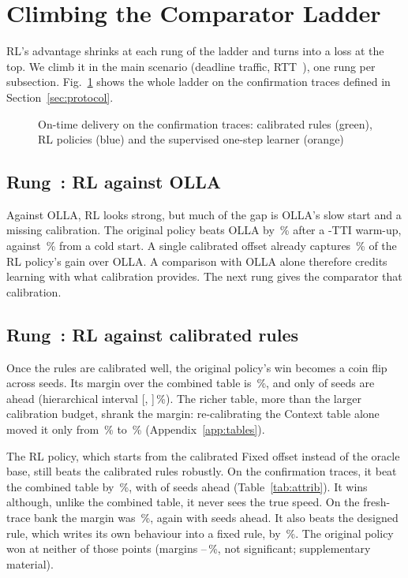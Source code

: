 \section{Climbing the Comparator Ladder}\label{sec:results}
RL's advantage shrinks at each rung of the ladder and turns into a loss at the top. We climb it in the main scenario (deadline traffic, RTT~\NCfgRtt), one rung per subsection. Fig.~\ref{fig:ladder} shows the whole ladder on the confirmation traces defined in Section~\ref{sec:protocol}.

\begin{figure}[t]
\centering

\caption{On-time delivery on the  confirmation traces: calibrated rules (green), RL policies (blue) and the supervised one-step learner (orange)}\label{fig:ladder}
\end{figure}

\subsection{Rung~: RL against OLLA}\label{sec:rung1}
Against OLLA, RL looks strong, but much of the gap is OLLA's slow start and a missing calibration. The original policy beats OLLA by \nosign{\NWoneOLLAWarmMar}\,\% after a \NWoneTTI-TTI warm-up, against \nosign{\NWoneOLLAColdMar}\,\% from a cold start. A single calibrated offset already captures \NMoneCalibShareFixed\,\% of the RL policy's gain over OLLA. A comparison with OLLA alone therefore credits learning with what calibration provides. The next rung gives the comparator that calibration.

\subsection{Rung~: RL against calibrated rules}\label{sec:rung2}
Once the rules are calibrated well, the original policy's win becomes a coin flip across seeds. Its margin over the combined table is \NGsixCtxJMar\,\%, and only \NGsixCtxJAbove{} of \NCfgSeeds{} seeds are ahead (hierarchical interval [\NGsixCtxJHierLo, \NGsixCtxJHierHi]\,\%). The richer table, more than the larger calibration budget, shrank the margin: re-calibrating the Context table alone moved it only from \nosign{\NMonePrimCtxMar}\,\% to \nosign{\NGsixCtxDMar}\,\% (Appendix~\ref{app:tables}).

The RL policy, which starts from the calibrated Fixed offset instead of the oracle base, still beats the calibrated rules robustly. On the confirmation traces, it beat the combined table by \,\%, with  of \NCfgSeeds{} seeds ahead (Table~\ref{tab:attrib}). It wins although, unlike the combined table, it never sees the true speed. On the fresh-trace bank the margin was \NFtCtxJMar\,\%, again with \NFtCtxJSeeds{} seeds ahead. It also beats the designed rule, which writes its own behaviour into a fixed rule, by \nosign{\NPSRuleCalMar}\,\%.  The original policy won at neither of those points (margins --\,\%, not significant; supplementary material).

